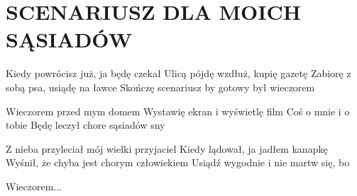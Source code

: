 \documentclass[../../../songbook.tex]{subfiles}
\begin{document}
\TabPositions{8cm} %
\section*{SCENARIUSZ DLA MOICH SĄSIADÓW}
{}
\vspace{0.5cm}
Kiedy powrócisz już, ja będę czekał		 \newline
Ulicą pójdę wzdłuż, kupię gazetę \newline
Zabiorę z sobą psa, usiądę na ławce \newline
Skończę scenariusz by gotowy był wieczorem \newline

\-\hspace{1cm} Wieczorem przed mym domem		 \newline
\-\hspace{1cm} Wystawię ekran i wyświetlę film	 \newline
\-\hspace{1cm} Coś o mnie i o tobie				 \newline
\-\hspace{1cm} Będę leczył chore sąsiadów sny	 \newline


Z nieba przyleciał mój wielki przyjaciel \newline
Kiedy lądował, ja jadłem kanapkę \newline
Wyśnił, że chyba jest chorym człowiekiem \newline
Usiądź wygodnie i nie martw się, bo \newline

\-\hspace{1cm} Wieczorem... \newline
\end{document}
